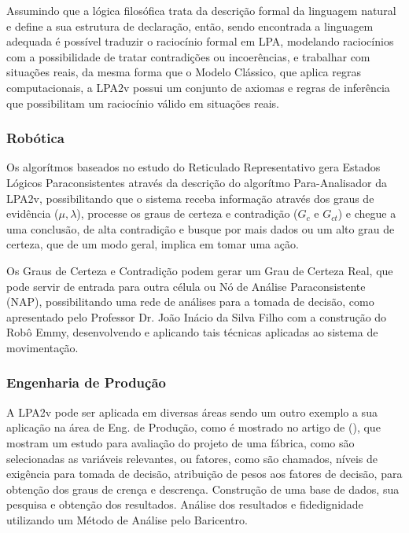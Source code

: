 Assumindo que a lógica filosófica trata da descrição formal da linguagem natural 
e define a sua estrutura de declaração, então, 
sendo encontrada a linguagem adequada 
é possível traduzir o raciocínio formal em LPA, 
modelando raciocínios com a possibilidade de 
tratar contradições ou incoerências, 
e trabalhar com situações reais, 
da mesma forma que o Modelo Clássico, 
que aplica regras computacionais, 
a LPA2v possui um conjunto de axiomas e regras de inferência 
que possibilitam um raciocínio válido em situações reais.

\subsubsection{Robótica}

Os algorítmos baseados no estudo do Reticulado Representativo gera 
Estados Lógicos Paraconsistentes através da 
descrição do algorítmo Para-Analisador da LPA2v, 
possibilitando que o sistema receba informação 
através dos graus de evidência ($\mu, \lambda$), 
processe os graus de certeza e contradição ($G_c$ e $G_{ct}$) e 
chegue a uma conclusão, de alta contradição e busque por mais dados ou 
um alto grau de certeza, que de um modo geral, implica em tomar uma ação. 

Os Graus de Certeza e Contradição podem gerar um Grau de Certeza Real, 
que pode servir de entrada para outra célula ou 
Nó de Análise Paraconsistente (NAP), 
possibilitando uma rede de análises para a tomada de decisão,
como apresentado pelo Professor Dr. João Inácio da Silva Filho 
com a construção do Robô Emmy, 
desenvolvendo e aplicando tais técnicas aplicadas ao sistema de movimentação.

\subsubsection{Engenharia de Produção}

A LPA2v pode ser aplicada em diversas áreas 
sendo um outro exemplo a sua aplicação na 
área de Eng. de Produção, 
como é mostrado no artigo de 
\citeauthor{FabioIsraelJair}(\citeyear{FabioIsraelJair}), 
que mostram um estudo para avaliação do projeto de uma fábrica, 
como são selecionadas as variáveis relevantes, ou fatores, como são chamados,
níveis de exigência para tomada de decisão, 
atribuição de pesos aos fatores de decisão, 
para obtenção dos graus de crença e descrença. 
Construção de uma base de dados, sua pesquisa e obtenção dos resultados.
Análise dos resultados e fidedignidade utilizando um 
Método de Análise pelo Baricentro.


